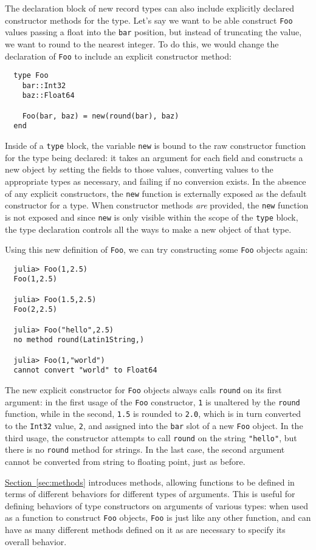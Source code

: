 \documentclass{article}
\newcommand{\Section}[1]{\hyperref[sec:#1]{Section~\ref*{sec:#1}}}
\begin{document}
The declaration block of new record types can also include explicitly declared constructor methods for the type.
Let's say we want to be able construct \verb|Foo| values passing a float into the \verb|bar| position, but instead of truncating the value, we want to round to the nearest integer.
To do this, we would change the declaration of \verb|Foo| to include an explicit constructor method:
\begin{verbatim}
  type Foo
    bar::Int32
    baz::Float64

    Foo(bar, baz) = new(round(bar), baz)
  end
\end{verbatim}
Inside of a \verb|type| block, the variable \verb|new| is bound to the raw constructor function for the type being declared:
it takes an argument for each field and constructs a new object by setting the fields to those values, converting values to the appropriate types as necessary, and failing if no conversion exists.
In the absence of any explicit constructors, the \verb|new| function is externally exposed as the default constructor for a type.
When constructor methods \emph{are} provided, the \verb|new| function is not exposed and since \verb|new| is only visible within the scope of the \verb|type| block, the type declaration controls all the ways to make a new object of that type.

Using this new definition of \verb|Foo|, we can try constructing some \verb|Foo| objects again:
\begin{verbatim}
  julia> Foo(1,2.5)
  Foo(1,2.5)

  julia> Foo(1.5,2.5)
  Foo(2,2.5)

  julia> Foo("hello",2.5)
  no method round(Latin1String,)

  julia> Foo(1,"world")
  cannot convert "world" to Float64
\end{verbatim}
The new explicit constructor for \verb|Foo| objects always calls \verb|round| on its first argument:
in the first usage of the \verb|Foo| constructor, \verb|1| is unaltered by the \verb|round| function, while in the second, \verb|1.5| is rounded to \verb|2.0|, which is in turn converted to the \verb|Int32| value, \verb|2|, and assigned into the \verb|bar| slot of a new \verb|Foo| object.
In the third usage, the constructor attempts to call \verb|round| on the string \verb|"hello"|, but there is no \verb|round| method for strings.
In the last case, the second argument cannot be converted from string to floating point, just as before.

\Section{methods} introduces methods, allowing functions to be defined in terms of different behaviors for different types of arguments.
This is useful for defining behaviors of type constructors on arguments of various types:
when used as a function to construct \verb|Foo| objects, \verb|Foo| is just like any other function, and can have as many different methods defined on it as are necessary to specify its overall behavior.
\end{document}
